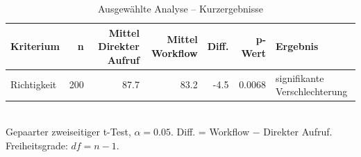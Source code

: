 \begin{table}[htbp]
\centering
\caption{Ausgewählte Analyse -- Kurzergebnisse}
\begin{tabular}{lrrrrrl}
\toprule
Kriterium & n & Mittel Direkter Aufruf & Mittel Workflow & Diff. & p-Wert & Ergebnis \\
\midrule
Richtigkeit & 200 & 87.7 & 83.2 & -4.5 & 0.0068 & signifikante Verschlechterung \\
\bottomrule
\end{tabular}
\\[2mm]
\footnotesize Gepaarter zweiseitiger t-Test, $\alpha=0.05$. Diff. = Workflow $-$ Direkter Aufruf. Freiheitsgrade: $df=n-1$.
\end{table}
